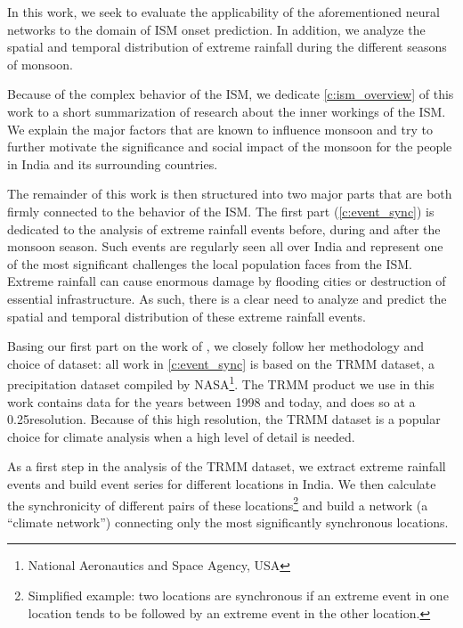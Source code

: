 In this work, we seek to evaluate the applicability of the aforementioned neural networks to the domain of ISM onset prediction. In addition, we analyze the spatial and temporal distribution of extreme rainfall during the different seasons of monsoon.

Because of the complex behavior of the ISM, we dedicate \cref{c:ism_overview} of this work to a short summarization of research about the inner workings of the ISM. We explain the major factors that are known to influence monsoon and try to further motivate the significance and social impact of the monsoon for the people in India and its surrounding countries.

The remainder of this work is then structured into two major parts that are both firmly connected to the behavior of the ISM. The first part (\cref{c:event_sync}) is dedicated to the analysis of extreme rainfall events before, during and after the monsoon season. Such events are regularly seen all over India and represent one of the most significant challenges the local population faces from the ISM. Extreme rainfall can cause enormous damage by flooding cities or destruction of essential infrastructure. As such, there is a clear need to analyze and predict the spatial and temporal distribution of these extreme rainfall events.

Basing our first part on the work of \citet{Stolbova.2015}, we closely follow her methodology and choice of dataset: all work in \cref{c:event_sync} is based on the TRMM dataset, a precipitation dataset compiled by NASA\footnote{National Aeronautics and Space Agency, USA}. The TRMM product we use in this work contains data for the years between 1998 and today, and does so at a 0.25\degree resolution. Because of this high resolution, the TRMM dataset is a popular choice for climate analysis when a high level of detail is needed.

As a first step in the analysis of the TRMM dataset, we extract extreme rainfall events and build event series for different locations in India. We then calculate the synchronicity of different pairs of these locations\footnote{Simplified example: two locations are synchronous if an extreme event in one location tends to be followed by an extreme event in the other location.} and build a network (a ``climate network'') connecting only the most significantly synchronous locations.

